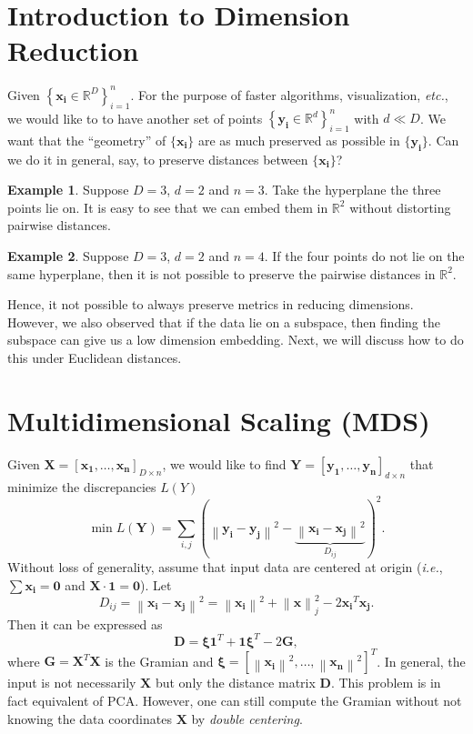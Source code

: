 \documentclass[11pt]{article}
\newcommand{\norm}[1]{\left\lVert#1\right\rVert}
\theoremstyle{definition}
\newtheorem{Example}{Example}
\begin{document}
\section{Introduction to Dimension Reduction}
Given $\left\{\mathbf{x_i} \in \mathbb{R}^D\right\}_{i=1}^n$. For the purpose of faster algorithms, visualization, \textit{etc.}, we  would like to  to have another set of points  $\left\{\mathbf{y_i}\in\mathbb{R}^d\right\}_{i=1}^n $ with $d\ll D$. We want that the ``geometry'' of $\{\mathbf{x_i}\}$ are as much preserved as possible in $\{\mathbf{y_i}\}$. Can we do it in general, say, to preserve distances between $\{\mathbf{x_i}\}$?
\begin{Example}
    Suppose $D=3$, $d=2$ and $n=3$. Take the hyperplane the three points lie on. It is easy to see that we can embed them in $\mathbb{R}^2$ without distorting pairwise distances.
\end{Example}
\begin{Example}
    Suppose $D=3$, $d=2$ and $n=4$. If the four points do not lie on the same hyperplane, then it is not possible to preserve the pairwise distances in $\mathbb{R}^2$.
\end{Example}
Hence, it not possible to always preserve metrics in reducing dimensions. However, we also observed that if the data lie on a subspace, then finding the subspace can give us a low dimension embedding. Next, we will discuss how to do this under Euclidean distances.

\section{Multidimensional Scaling (MDS)}
Given $\mathbf{X} = [\mathbf{x_1},\ldots,\mathbf{x_n}]_{D\times n}$, we would like to find $\mathbf{Y}= [\mathbf{y_1},\ldots, \mathbf{y_n}]_{d\times n}$ that minimize the discrepancies $L(Y)$
\begin{equation}\label{eqn:otp}
    \min L(\mathbf{Y}) = \sum_{i,j} \left(\norm{\mathbf{y_i}-\mathbf{y_j}}^2-\underbrace{\norm{\mathbf{x_i}-\mathbf{x_j}}^2}_{D_{ij}}\right)^2.
\end{equation}
Without loss of generality, assume that input data are centered at origin (\textit{i.e.}, $\sum \mathbf{x_i} = \mathbf{0}$ and $\mathbf{X}\cdot \mathbf{1} = \mathbf{0}$).  Let $$D_{ij} = \norm{\mathbf{x_i}-\mathbf{x_j}}^2 = \norm{\mathbf{x_i}}^2 + \norm{\mathbf{x}}_j^2 - 2\mathbf{x_i}^T\mathbf{x_j}.$$ Then it can be expressed as
\[
    \mathbf{D} = \bm{\xi}\mathbf{1}^T +  \mathbf{1}\bm{\xi}^T - 2\bm{G}, 
\]
where $\mathbf{G} = \mathbf{X}^T\mathbf{X}$ is the Gramian and $\bm{\xi} = \left[\norm{\mathbf{x_i}}^2 , \ldots, \norm{\mathbf{x_n}}^2\right]^T$. In general, the input is not necessarily $\mathbf{X}$ but only the distance matrix $\mathbf{D}$. This problem is in fact equivalent of PCA\@. However, one can still compute the Gramian without not knowing the data coordinates $\mathbf{X}$ by \textit{double centering}.
\end{document}
